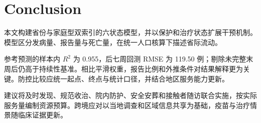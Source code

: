 \section{Conclusion}
\label{sec:conclusion}

本文构建省份与家庭型双索引的六状态模型，并以保护和治疗状态扩展干预机制。模型区分发病量、报告量与死亡量，在统一人口核算下描述省际流动。

参考预测的样本内 $R^2$ 为 0.955，后七周回测 RMSE 为 119.50 例；剔除未完整末周后仍高于持续性基准。相比平滑权重，报告比例和外推条件对结果解释更为关键。防控比较应统一起点、终点与统计口径，并结合地区服务能力更新。

建议将及时发现、规范收治、院内防护、安全安葬和接触者随访联合实施，按实际服务量编制资源预算。跨境应对以当地调查和区域信息共享为基础，疫苗与治疗情景随临床证据更新。
